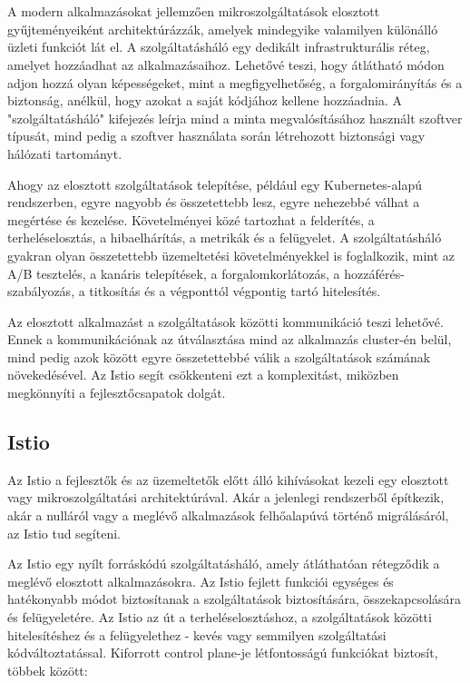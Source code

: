 \chapter{\istio}
A modern alkalmazásokat jellemzően mikroszolgáltatások elosztott gyűjteményeiként architektúrázzák, amelyek mindegyike valamilyen különálló üzleti funkciót lát el. A szolgáltatásháló egy dedikált infrastrukturális réteg, amelyet hozzáadhat az alkalmazásaihoz. Lehetővé teszi, hogy átlátható módon adjon hozzá olyan képességeket, mint a megfigyelhetőség, a forgalomirányítás és a biztonság, anélkül, hogy azokat a saját kódjához kellene hozzáadnia. A "szolgáltatásháló" kifejezés leírja mind a minta megvalósításához használt szoftver típusát, mind pedig a szoftver használata során létrehozott biztonsági vagy hálózati tartományt.

Ahogy az elosztott szolgáltatások telepítése, például egy Kubernetes-alapú rendszerben, egyre nagyobb és összetettebb lesz, egyre nehezebbé válhat a megértése és kezelése. Követelményei közé tartozhat a felderítés, a terheléselosztás, a hibaelhárítás, a metrikák és a felügyelet. A szolgáltatásháló gyakran olyan összetettebb üzemeltetési követelményekkel is foglalkozik, mint az A/B tesztelés, a kanáris telepítések, a forgalomkorlátozás, a hozzáférés-szabályozás, a titkosítás és a végponttól végpontig tartó hitelesítés.

Az elosztott alkalmazást a szolgáltatások közötti kommunikáció teszi lehetővé. Ennek a kommunikációnak az útválasztása mind az alkalmazás cluster-én belül, mind pedig azok között egyre összetettebbé válik a szolgáltatások számának növekedésével. Az Istio segít csökkenteni ezt a komplexitást, miközben megkönnyíti a fejlesztőcsapatok dolgát.

\section{Istio}
Az Istio a fejlesztők és az üzemeltetők előtt álló kihívásokat kezeli egy elosztott vagy mikroszolgáltatási architektúrával. Akár a jelenlegi rendszerből építkezik, akár a nulláról vagy a meglévő alkalmazások felhőalapúvá történő migrálásáról, az Istio tud segíteni.

Az Istio egy nyílt forráskódú szolgáltatásháló, amely átláthatóan rétegződik a meglévő elosztott alkalmazásokra. Az Istio fejlett funkciói egységes és hatékonyabb módot biztosítanak a szolgáltatások biztosítására, összekapcsolására és felügyeletére. Az Istio az út a terheléselosztáshoz, a szolgáltatások közötti hitelesítéshez és a felügyelethez - kevés vagy semmilyen szolgáltatási kódváltoztatással. Kiforrott control plane-je létfontosságú funkciókat biztosít, többek között:

